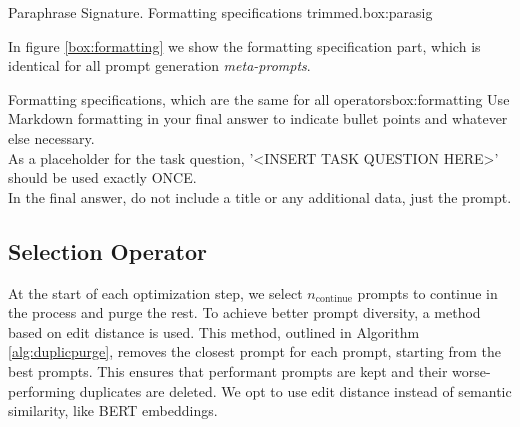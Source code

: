 \begin{figurebox}{Paraphrase Signature. Formatting specifications trimmed.}{box:parasig}
\end{figurebox}
In figure \ref{box:formatting} we show the formatting specification part, which is identical for all prompt generation \textit{meta-prompts}.

\begin{figurebox}{Formatting specifications, which are the same for all operators}{box:formatting}
    Use Markdown formatting in your final answer to indicate bullet points and whatever else necessary.\\
    As a placeholder for the task question, '<INSERT TASK QUESTION HERE>' should be used exactly ONCE.\\
    In the final answer, do not include a title or any additional data, just the prompt.
\end{figurebox}

\subsection{Selection Operator}
At the start of each optimization step, we select $n_{\text{continue}}$ prompts to continue in the process and purge the rest. 
To achieve better prompt diversity, a method based on edit distance is used. This method, outlined in Algorithm \ref{alg:duplicpurge},
removes the closest prompt for each prompt, starting from the best prompts. This ensures that performant prompts are kept and their worse-performing duplicates are deleted.
We opt to use edit distance instead of semantic similarity, like BERT embeddings.

